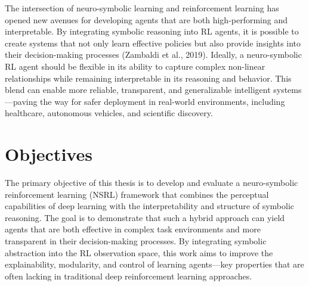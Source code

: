 The intersection of neuro-symbolic learning and reinforcement learning has opened new avenues for developing agents that are both high-performing and interpretable. By integrating symbolic reasoning into RL agents, it is possible to create systems that not only learn effective policies but also provide insights into their decision-making processes (Zambaldi et al., 2019). Ideally, a neuro-symbolic RL agent should be flexible in its ability to capture complex non-linear relationships while remaining interpretable in its reasoning and behavior. This blend can enable more reliable, transparent, and generalizable intelligent systems—paving the way for safer deployment in real-world environments, including healthcare, autonomous vehicles, and scientific discovery.

%


\section{Objectives} \label{se:objectives}
The primary objective of this thesis is to develop and evaluate a neuro-symbolic reinforcement learning (NSRL) framework that combines the perceptual capabilities of deep learning with the interpretability and structure of symbolic reasoning. The goal is to demonstrate that such a hybrid approach can yield agents that are both effective in complex task environments and more transparent in their decision-making processes. By integrating symbolic abstraction into the RL observation space, this work aims to improve the explainability, modularity, and control of learning agents—key properties that are often lacking in traditional deep reinforcement learning approaches.

